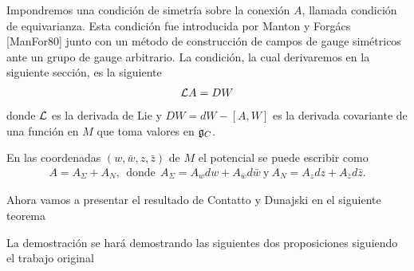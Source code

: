 Impondremos una condición de simetría sobre la conexión $A$, llamada condición de equivarianza. Esta condición fue introducida por Manton y Forgács [ManFor80] junto con un método de construcción de campos de gauge simétricos ante un grupo de gauge arbitrario. La condición, la cual derivaremos en la siguiente sección, es la siguiente
\begin{align}
	\mathcal{L} A=DW
\end{align}
donde $\mathcal{L}$ es la derivada de Lie y $DW=dW-[A,W]$ es la derivada covariante de una función en $M$ que toma valores en $\mathfrak{g}_C$.

En las coordenadas $(w,\bar w,z,\bar z)$ de $M$ el potencial se puede escribir como
\begin{align}
	A = A_{\Sigma}+A_N, \ \ \text{donde} \ \ A_{\Sigma}=A_w dw+A_{\bar w}d\bar w \ \text{y} \ A_N=A_zdz+A_{\bar z}d\bar z.
\end{align}

Ahora vamos a presentar el resultado de Contatto y Dunajski en el siguiente teorema


La demostración se hará demostrando las siguientes dos proposiciones siguiendo el trabajo original

